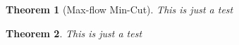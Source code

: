 \documentclass{article}
\newtheorem{theorem}{Theorem}
\begin{document}
\begin{theorem}[Max-flow Min-Cut]
This is just a test
\end{theorem}

\begin{theorem}
This is just a test
\end{theorem}
\end{document}
